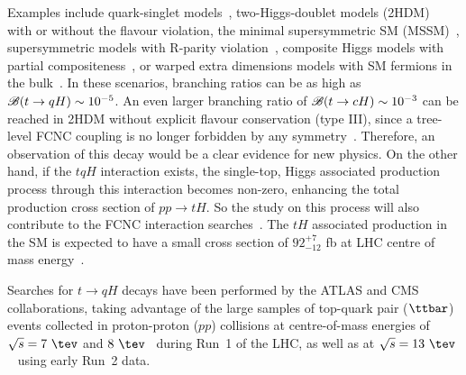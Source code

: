 Examples include quark-singlet models~\cite{AguilarSaavedra:2002kr}, two-Higgs-doublet models (2HDM)~\cite{Branco:2hdm2012} with or without the flavour violation,
the minimal supersymmetric SM (MSSM)~\cite{Bejar:2000ub, Guasch:1999jp,Cao:2007dk,Cao:2014udj},
supersymmetric models with R-parity violation~\cite{Eilam:2001dh}, composite Higgs models with partial compositeness~\cite{Azatov:2014lha}, 
or warped extra dimensions models with SM fermions in the bulk~\cite{Azatov:2009na}. 
In these scenarios, branching ratios can be as high as $\mathscr{B}(t\to qH) \sim 10^{-5}$. 
An even larger branching ratio of  $\mathscr{B}(t\to cH) \sim 10^{-3}$ can be reached in 2HDM without explicit flavour conservation (type III),
since a tree-level FCNC coupling is no longer forbidden by any symmetry~\cite{Cheng:1987rs,Baum:2008qm,Chen:2013qta,Chiang:2015cba,Crivellin:2015hha,Botella:2015hoa, Gori:2017tvg,Chiang:2017fjr}. 
Therefore, an observation of this decay would be a clear evidence for new physics.
On the other hand, if the $tqH$ interaction exists, the single-top, Higgs associated production process through this interaction becomes non-zero, enhancing the total
production cross section of $pp\rightarrow tH$.
So the study on this process will also contribute to the FCNC interaction searches~\cite{Greljo:2014dka}.
The $tH$ associated production in the SM is expected to have a small cross section of $92^{+7}_{-12}$ fb at LHC centre of mass energy~\cite{deFlorian:2016spz}.

Searches for $t \to qH$ decays have been performed by the ATLAS and CMS collaborations, taking advantage of the large samples
of top-quark pair ($\ttbar$) events collected in proton-proton ($pp$) collisions at centre-of-mass energies of $\sqrt{s}=7~\tev$ and $8~\tev$~\cite{Aad:2014dya,Aad:2015pja,Khachatryan:2016atv} during Run~1 of the LHC, as well as at $\sqrt{s}=13~\tev$~\cite{fcnc36} using early Run~2 data.

